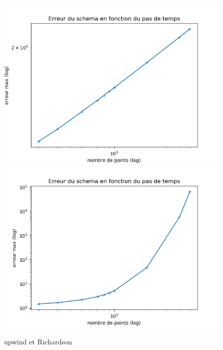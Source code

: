 \documentclass[12pt]{article}
\begin{document}
\begin{figure}[H]
	\centering
	\includegraphics[scale=0.40]{erreur_schema1_init3.png}
	\includegraphics[scale=0.40]{erreur_schema2_init3.png}
	\caption{upwind et Richardson}
	\label{1D}
	\end{figure}	
\end{document}
